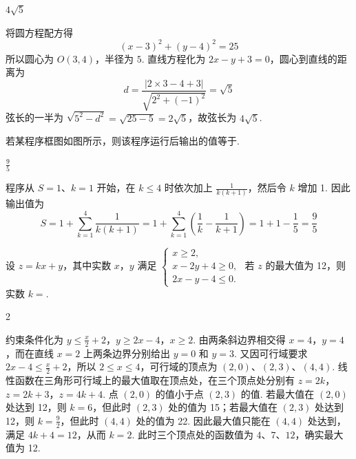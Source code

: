 \begin{answer}
\(4\sqrt{5}\)
\end{answer}

\begin{solution}
将圆方程配方得
\[
(x-3)^2+(y-4)^2=25
\]
所以圆心为 \(O(3,4)\)，半径为 \(5\). 直线方程化为 \(2x-y+3=0\)，圆心到直线的距离为
\[
d=\frac{|2\times3-4+3|}{\sqrt{2^2+(-1)^2}}=\sqrt5
\]
弦长的一半为 \(\sqrt{5^2-d^2}=\sqrt{25-5}=2\sqrt5\)，故弦长为 \(4\sqrt5\).
\end{solution}

\begin{problem}
若某程序框图如图所示，则该程序运行后输出的值等于\fillinblank{}.

\end{problem}

\begin{answer}
\(\frac{9}{5}\)
\end{answer}

\begin{solution}
程序从 \(S=1\)、\(k=1\) 开始，在 \(k\leqslant4\) 时依次加上 \(\frac{1}{k(k+1)}\)，然后令 \(k\) 增加 1. 因此输出值为
\[
S=1+\sum_{k=1}^{4}\frac{1}{k(k+1)}
=1+\sum_{k=1}^{4}\left(\frac{1}{k}-\frac{1}{k+1}\right)
=1+1-\frac{1}{5}=\frac{9}{5}
\]
\end{solution}

\begin{problem}
设 \(z = kx + y\)，其中实数 \(x\)，\(y\) 满足 \(\begin{cases}
x \geqslant 2,\\
x - 2y + 4 \geqslant 0,\\
2x - y - 4 \leqslant 0.
\end{cases}\) 若 \(z\) 的最大值为 12，则实数 \(k = \)\fillinblank{}.
\end{problem}

\begin{answer}
2
\end{answer}

\begin{solution}
约束条件化为
\(y\leqslant\frac{x}{2}+2\)，\(y\geqslant2x-4\)，\(x\geqslant2\).
由两条斜边界相交得 \(x=4\)，\(y=4\)，而在直线 \(x=2\) 上两条边界分别给出 \(y=0\) 和 \(y=3\). 又因可行域要求 \(2x-4\leqslant\frac{x}{2}+2\)，所以 \(2\leqslant x\leqslant4\)，可行域的顶点为 \((2,0)\)、\((2,3)\)、\((4,4)\). 线性函数在三角形可行域上的最大值取在顶点处，在三个顶点处分别有
\(z=2k\)，\(z=2k+3\)，\(z=4k+4\).
点 \((2,0)\) 的值小于点 \((2,3)\) 的值. 若最大值在 \((2,0)\) 处达到 12，则 \(k=6\)，但此时 \((2,3)\) 处的值为 15；若最大值在 \((2,3)\) 处达到 12，则 \(k=\frac{9}{2}\)，但此时 \((4,4)\) 处的值为 22. 因此最大值只能在 \((4,4)\) 处达到，满足 \(4k+4=12\)，从而 \(k=2\). 此时三个顶点处的函数值为 \(4\)、\(7\)、\(12\)，确实最大值为 12.
\end{solution}

